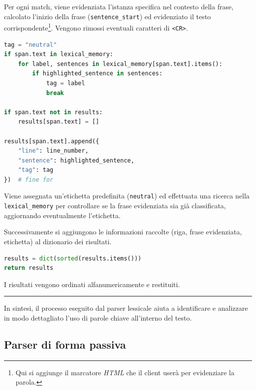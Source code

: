 \documentclass[12pt]{report}
\newcommand{\html}{\textsl{HTML}\xspace}
\begin{document}
\noindent Per ogni match, viene evidenziata l'istanza specifica nel contesto della frase, calcolato l'inizio della frase (\texttt{sentence\_start}) ed evidenziato il testo corrispondente\footnote{Qui si aggiunge il marcatore \html che il client userà per evidenziare la parola.}. Vengono rimossi eventuali caratteri di \texttt{<CR>}.


\begin{mdframed}
\small
\begin{lstlisting}[language=Python]
tag = "neutral"
if span.text in lexical_memory:
    for label, sentences in lexical_memory[span.text].items():
        if highlighted_sentence in sentences:
            tag = label
            break

if span.text not in results:
    results[span.text] = []

results[span.text].append({
    "line": line_number,
    "sentence": highlighted_sentence,
    "tag": tag
})  # fine for
\end{lstlisting}
\end{mdframed}

\noindent Viene assegnata un'etichetta predefinita (\texttt{neutral}) ed effettuata una ricerca nella \texttt{lexical\_memory} per controllare se la frase evidenziata sia già classificata, aggiornando eventualmente l'etichetta.

Successivamente si aggiungono le informazioni raccolte (riga, frase evidenziata, etichetta) al dizionario dei risultati.


\begin{mdframed}
\small
\begin{lstlisting}[language=Python]
results = dict(sorted(results.items()))
return results
\end{lstlisting}
\end{mdframed}

\noindent I risultati vengono ordinati alfanumericamente e restituiti.

{\centering \rule{0.5\linewidth}{0.1pt} \par\vspace{0.25cm}}

In sintesi, il processo eseguito dal \textsf{parser lessicale} aiuta a identificare e analizzare in modo dettagliato l’uso di parole chiave all’interno del testo.


\subsection{Parser di forma passiva}
\end{document}
